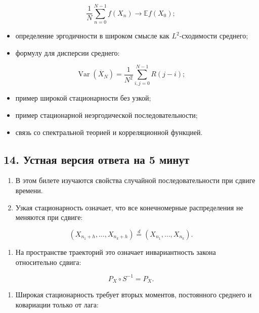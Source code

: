 \documentclass[
  11pt,
  a4paper,
]{article}
\providecommand{\tightlist}{%
  \setlength{\itemsep}{0pt}\setlength{\parskip}{0pt}}
\begin{document}
\[
\frac1N\sum_{n=0}^{N-1}f(X_n)\to\mathbb E f(X_0);
\]

\begin{itemize}
\tightlist
\item
  определение эргодичности в широком смысле как \(L^2\)-сходимости
  среднего;
\item
  формулу для дисперсии среднего:
\end{itemize}

\[
\operatorname{Var}(\overline X_N)
=
\frac1{N^2}\sum_{i,j=0}^{N-1}R(j-i);
\]

\begin{itemize}
\tightlist
\item
  пример широкой стационарности без узкой;
\item
  пример стационарной неэргодической последовательности;
\item
  связь со спектральной теорией и корреляционной функцией.
\end{itemize}

\subsection{14. Устная версия ответа на 5
минут}\label{ux443ux441ux442ux43dux430ux44f-ux432ux435ux440ux441ux438ux44f-ux43eux442ux432ux435ux442ux430-ux43dux430-5-ux43cux438ux43dux443ux442}

\begin{enumerate}
\def\labelenumi{\arabic{enumi}.}
\tightlist
\item
  В этом билете изучаются свойства случайной последовательности при
  сдвиге времени.
\item
  Узкая стационарность означает, что все конечномерные распределения не
  меняются при сдвиге:
\end{enumerate}

\[
(X_{n_1+h},\ldots,X_{n_k+h})
\stackrel d=
(X_{n_1},\ldots,X_{n_k}).
\]

\begin{enumerate}
\def\labelenumi{\arabic{enumi}.}
\setcounter{enumi}{2}
\tightlist
\item
  На пространстве траекторий это означает инвариантность закона
  относительно сдвига:
\end{enumerate}

\[
P_X\circ S^{-1}=P_X.
\]

\begin{enumerate}
\def\labelenumi{\arabic{enumi}.}
\setcounter{enumi}{3}
\tightlist
\item
  Широкая стационарность требует вторых моментов, постоянного среднего и
  ковариации только от лага:
\end{enumerate}
\end{document}
